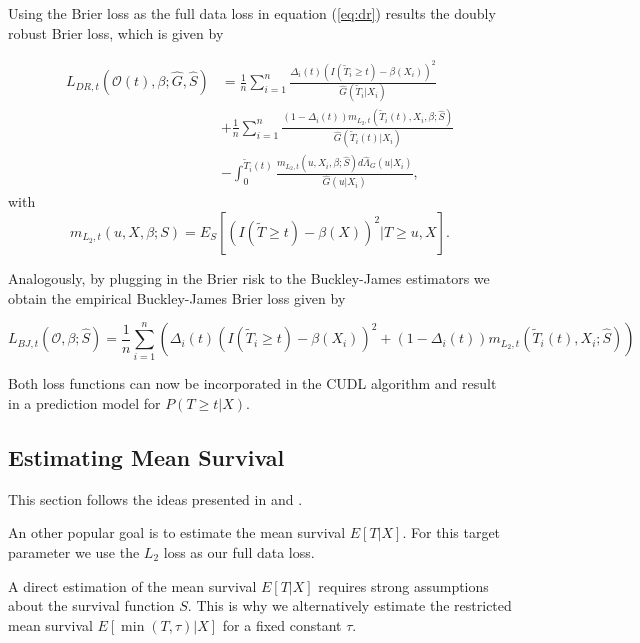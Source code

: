 \documentclass[12pt, a4paper]{scrartcl}
\theoremstyle{definition}
\theoremstyle{plain}
\numberwithin{equation}{section}
\numberwithin{figure}{section}
\numberwithin{table}{section}
\begin{document}
	Using the Brier loss as the full data loss in equation (\ref{eq:dr}) results the doubly robust Brier loss, which is given by
	
	\begin{equation*}
	\begin{split}
		L_{DR, t}(\mathcal{O}(t),\beta; \hat{G},\hat{S}) &=  \frac{1}{n} \sum_{i=1}^n \frac{\Delta_i(t)(I(\tilde{T}_i \geq t)-\beta(X_i))^2}{\hat{G}(\tilde{T}_i \vert X_i)}\\
		& + \frac{1}{n} \sum_{i=1}^n \frac{(1-\Delta_i(t))m_{L_2,t}(\tilde{T}_i(t),X_i,\beta; \hat{S})}{\hat{G}(\tilde{T}_i(t) \vert X_i)}\\
		& - \int_{0}^{\tilde{T}_i(t)} \frac{m_{L_2,t}(u,X_i,\beta; \hat{S})d\hat{\Lambda}_G(u\vert X_i)}{\hat{G}(u \vert X_i)},
	\end{split}
	\end{equation*}
	 with
	 \begin{equation*}
	 	m_{L_2,t}(u,X,\beta;S) = E_S[(I(\tilde{T}\geq t)-\beta(X))^2 \vert T \geq u, X].
	 \end{equation*}
	
	Analogously, by plugging in the Brier risk to the Buckley-James estimators we obtain the empirical Buckley-James Brier loss given by
	
	\begin{equation*}
		L_{BJ,t}(\mathcal{O},\beta; \hat{S}) = \frac{1}{n} \sum_{i=1}^n \left( \Delta_i(t)(I(\tilde{T}_i\geq t)-\beta(X_i))^2 + (1- \Delta_i(t))m_{L_2,t}(\tilde{T}_i(t), X_i; \hat{S})\right)
	\end{equation*}
	
	Both loss functions can now be incorporated in the CUDL algorithm and result in a prediction model for $P(T\geq t\vert X)$.

	\subsection{Estimating Mean Survival}
	
	This section follows the ideas presented in \citet*{basearticle} and \citet*{strawderman}.
	
	An other popular goal is to estimate the mean survival $E[T\vert X]$.
	For this target parameter we use the $L_2$ loss as our full data loss.
	
	A direct estimation of the mean survival $E[T\vert X]$ requires strong assumptions about the survival function $S$.
	This is why we alternatively estimate the restricted mean survival $E[\min(T, \tau)\vert X]$ for a fixed constant $\tau$.
	
\end{document}
